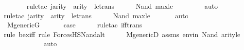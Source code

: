 \begin{isabellebody}
\ \ \ \ \ \ \isamarkupfalse%
{\isacharparenleft}{\kern0pt}rule{\isacharunderscore}{\kern0pt}tac\ j{\isacharequal}{\kern0pt}{\isachardoublequoteopen}arity{\isacharparenleft}{\kern0pt}{\isasymphi}{\isacharparenright}{\kern0pt}\ {\isasymunion}\ arity{\isacharparenleft}{\kern0pt}{\isasympsi}{\isacharparenright}{\kern0pt}{\isachardoublequoteclose}\ \ le{\isacharunderscore}{\kern0pt}trans{\isacharparenright}{\kern0pt}\isanewline
\ \ \ \ \isamarkupfalse%
\ Nand\ max{\isacharunderscore}{\kern0pt}le{}\isanewline
\ \ \ \ \ \ \ \isamarkupfalse%
\ auto{\isacharbrackleft}{\kern0pt}{}{\isacharbrackright}{\kern0pt}\isanewline
\ \ \ \ \ \ \isamarkupfalse%
{\isacharparenleft}{\kern0pt}rule{\isacharunderscore}{\kern0pt}tac\ j{\isacharequal}{\kern0pt}{\isachardoublequoteopen}arity{\isacharparenleft}{\kern0pt}{\isasymphi}{\isacharparenright}{\kern0pt}\ {\isasymunion}\ arity{\isacharparenleft}{\kern0pt}{\isasympsi}{\isacharparenright}{\kern0pt}{\isachardoublequoteclose}\ \ le{\isacharunderscore}{\kern0pt}trans{\isacharparenright}{\kern0pt}\isanewline
\ \ \ \ \isamarkupfalse%
\ Nand\ max{\isacharunderscore}{\kern0pt}le{}\isanewline
\ \ \ \ \ \isamarkupfalse%
\ auto{\isacharbrackleft}{\kern0pt}{}{\isacharbrackright}{\kern0pt}\isanewline
\ \ \ \ \isamarkupfalse%
\isanewline
\isanewline
\ \ \isamarkupfalse%
\ \isanewline
\ \ \isamarkupfalse%
\ {\isacartoucheopen}M{\isacharunderscore}{\kern0pt}generic{\isacharparenleft}{\kern0pt}G{\isacharparenright}{\kern0pt}{\isacartoucheclose}\isanewline
\ \ \isamarkupfalse%
\isanewline
\ \ \isamarkupfalse%
\ {\isacharquery}{\kern0pt}case\ \isanewline
\ \ \ \ \isamarkupfalse%
{\isacharparenleft}{\kern0pt}rule{\isacharunderscore}{\kern0pt}tac\ iff{\isacharunderscore}{\kern0pt}trans{\isacharparenright}{\kern0pt}\ \isanewline
\ \ \ \ \ \isamarkupfalse%
{\isacharparenleft}{\kern0pt}rule\ bex{\isacharunderscore}{\kern0pt}iff{\isacharcomma}{\kern0pt}\ rule\ ForcesHS{\isacharunderscore}{\kern0pt}Nand{\isacharunderscore}{\kern0pt}alt{\isacharparenright}{\kern0pt}\isanewline
\ \ \ \ \isamarkupfalse%
\ M{\isacharunderscore}{\kern0pt}genericD\ assms\ envin\ Nand\ arityle\isanewline
\ \ \ \ \ \ \ \ \ \ \isamarkupfalse%
\ auto{\isacharbrackleft}{\kern0pt}{}{\isacharbrackright}{\kern0pt}\isanewline

\end{isabellebody}
